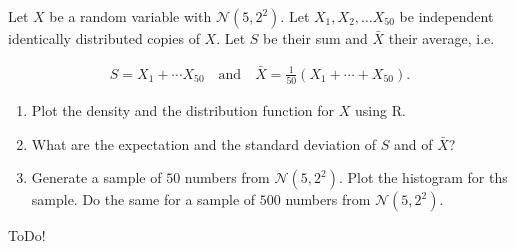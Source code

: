 
\begin{exercise}

Let $X$ be a random variable with $\mathcal N(5, 2^2)$.
Let $X_1, X_2, \dots X_{50}$ be independent identically distributed copies of $X$.
Let $S$ be their sum and $\bar X$ their average, i.e.

\begin{align*}
    S = X_1 + \cdots X_{50}
    \quad
    \text{and}
    \quad
    \bar X = \frac{1}{50} (X_1 + \cdots + X_{50}).
\end{align*}

\begin{enumerate}[label = (\alph*)]

    \item Plot the density and the distribution function for $X$ using R.

    \item What are the expectation and the standard deviation of $S$ and of $\bar X$?

    \item Generate a sample of $50$ numbers from $\mathcal N(5, 2^2)$.
    Plot the histogram for ths sample.
    Do the same for a sample of $500$ numbers from $\mathcal N(5, 2^2)$.

\end{enumerate}

\end{exercise}


\begin{solution}

ToDo!

\end{solution}

